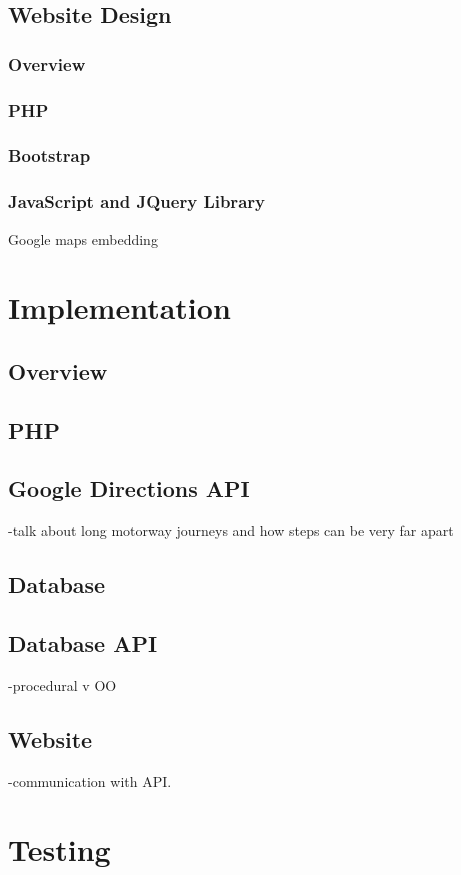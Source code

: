 \documentclass[11pt]{article}
\begin{document}
	\subsection{Website Design}
		\subsubsection{Overview}
		\subsubsection{PHP}
		\subsubsection{Bootstrap}
		\subsubsection{JavaScript and JQuery Library}
		Google maps embedding

\section{Implementation}
	\subsection{Overview}
	\subsection{PHP}
	\subsection{Google Directions API}
	-talk about long motorway journeys and how steps can be very far apart
	\subsection{Database}
	\subsection{Database API}
	-procedural v OO
	\subsection{Website}
	-communication with API.
	
\section{Testing}
\end{document}
